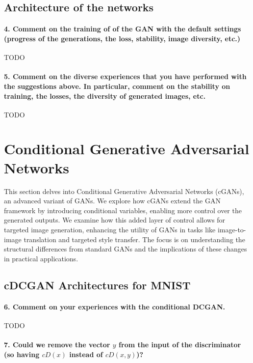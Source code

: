 \subsection{Architecture of the networks}

\paragraph*{4. Comment on the training of of the GAN with the default settings (progress of the generations, the loss, stability, image diversity, etc.)}

TODO

\paragraph*{5. Comment on the diverse experiences that you have performed with the suggestions above. In particular, comment on the stability on training, the losses, the diversity of generated images, etc.}

TODO

\section{Conditional Generative Adversarial Networks}

This section delves into Conditional Generative Adversarial Networks (cGANs), an advanced variant of GANs. We explore how cGANs extend the GAN framework by introducing conditional variables, enabling more control over the generated outputs. We examine how this added layer of control allows for targeted image generation, enhancing the utility of GANs in tasks like image-to-image translation and targeted style transfer. The focus is on understanding the structural differences from standard GANs and the implications of these changes in practical applications.

\subsection{cDCGAN Architectures for MNIST}

\paragraph*{6. Comment on your experiences with the conditional DCGAN.}

TODO

\paragraph*{7. Could we remove the vector $y$ from the input of the discriminator (so having $cD(x)$ instead of $cD(x, y)$)?}

